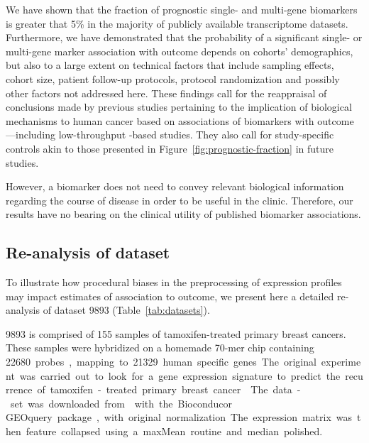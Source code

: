 We have shown that the fraction of prognostic single- and multi-gene biomarkers
is greater that 5\% in the majority of publicly available transcriptome
datasets.  Furthermore, we have demonstrated that the probability of a
significant single- or multi-gene marker association with outcome depends on
cohorts’ demographics, but also to a large extent on technical factors that
include sampling effects, cohort size, patient follow-up protocols, protocol
randomization and possibly other factors not addressed here.  These findings
call for the reappraisal of conclusions made by previous studies pertaining to
the implication of biological mechanisms to human cancer based on associations
of biomarkers with outcome---including low-throughput -based
studies.  They also call for study-specific controls akin to those presented in
Figure~\ref{fig:prognostic-fraction} in future studies.

However, a biomarker does not need to convey relevant biological information
regarding the course of disease in order to be useful in the clinic.  Therefore,
our results have no bearing on the clinical utility of published biomarker
associations.

\subsection{Re-analysis of dataset }
\label{sec:reanalysis-gse9893}
To illustrate how procedural biases in the preprocessing of expression profiles
may impact estimates of association to outcome, we present here a detailed
re-analysis of dataset 9893 (Table~\ref{tab:datasets}).

9893 is comprised of 155 samples of tamoxifen-treated primary
breast cancers.  These samples were hybridized on a homemade \mbox{70-mer} chip
containing \SI{22680} probes, mapping to \SI{21329} human specific genes.  The
original experiment was carried out to look for a gene expression signature to
predict the recurrence of tamoxifen-treated primary breast
cancer.\cite{chanrion_gene_2008}

The data-set was downloaded from  with the \textsf{Bioconducor
  GEOquery} package, with original normalization.  The expression matrix was
then feature collapsed using a \textsf{maxMean} routine and median polished.


